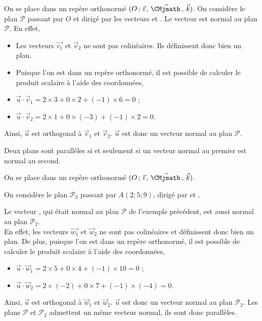 \documentclass[11pt,fleqn, openany]{book} %
\begin{document}
\begin{example}On se place dans un repère orthonormé $\Oijk$. On considère le plan $\mathcal{P}$ passant par $O$ et dirigé par les vecteurs \renewcommand{\arraystretch}{1} et \renewcommand{\arraystretch}{1}. Le vecteur \renewcommand{\arraystretch}{1} est  normal au plan $\mathcal{P}$. En effet,
\begin{itemize}
\item Les vecteurs $\vec{v_1}$ et $\vec{v}_2$ ne sont pas colinéaires. Ils définissent donc bien un plan.
\item Puisque l'on est dans un repère orthonormé, il est possible de calculer le produit scalaire à l'aide des coordonnées,
\item $ \vec u \cdot \vec v_1 = 2 \times 3 + 0 \times 2 + (-1) \times 6 = 0$ ;
\item $\vec u \cdot \vec v_2 = 2 \times 1 + 0 \times (-3) + (-1) \times 2 = 0$.
\end{itemize}
Ainsi, $\vec u$ est orthogonal à $\vec v_1$ et $\vec v_2$. $\vec u$ est donc un vecteur normal au plan $\mathcal{P}$.\end{example}

\begin{proposition}Deux plans sont parallèles si et seulement si un vecteur normal au premier est normal au second.\end{proposition}

\begin{example}On se place dans un repère orthonormé $\Oijk$. 

On considère le plan $\mathcal{P}_2$ passant par $A(2;5;9)$, dirigé par \renewcommand{\arraystretch}{1} et \renewcommand{\arraystretch}{1}. 

Le vecteur \renewcommand{\arraystretch}{1}, qui était normal au plan $\mathcal{P}$ de l'exemple précédent, est aussi normal au plan $\mathcal{P}_2$.\\ En effet, les vecteurs $\vec{w_1}$ et $\vec{w}_2$ ne sont pas colinéaires et définissent donc bien un plan.
De plus, puisque l'on est dans un repère orthonormé, il est possible de calculer le produit scalaire à l'aide des coordonnées,
\begin{itemize}\item $ \vec u \cdot \vec w_1 = 2 \times 5 + 0 \times 4 + (-1) \times 10 = 0$ ;
\item $\vec u \cdot \vec w_2 = 2 \times (-2) + 0 \times 7 + (-1) \times (-4) = 0$.
\end{itemize}
Ainsi, $\vec u$ est orthogonal à $\vec w_1$ et $\vec w_2$. $\vec u$ est donc un vecteur normal au plan $\mathcal{P}_2$. Les plans $\mathcal{P}$ et $\mathcal{P}_2$ admettent un même vecteur normal, ils sont donc parallèles.\end{example}
\end{document}
